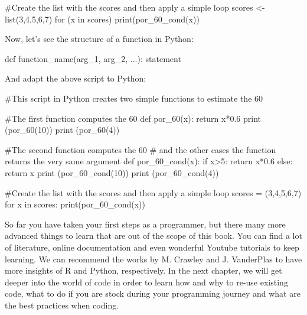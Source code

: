 \begin{exampler}
#Create the list with the scores and then apply a simple loop
scores <- list(3,4,5,6,7)
for (x in scores)
{
  print(por_60_cond(x))
}
\end{exampler}

Now, let’s see the structure of a function in Python:

\begin{examplepy}
def function_name(arg_1, arg_2, ...):
  statement
\end{examplepy}

And adapt the above script to Python:

\begin{examplepy}
#This script in Python creates two simple functions to estimate the 60%

#The first function computes the 60%
def por_60(x):
  return x*0.6
print (por_60(10))
print (por_60(4))

#The second function computes the 60%
# and the other cases the function returns the very same argument
def por_60_cond(x):
  if x>5:
    return x*0.6
  else:
    return x
print (por_60_cond(10))
print (por_60_cond(4))

#Create the list with the scores and then apply a simple loop
scores = (3,4,5,6,7)
for x in scores:
  print(por_60_cond(x))
\end{examplepy}

So far you have taken your first steps as a programmer, but there many more advanced things to learn that are out of the scope of this book. You can find a lot of literature, online documentation and even wonderful Youtube tutorials to keep learning. We can recommend the works by M. Crawley\cite{crawley2012r}  and J. VanderPlas\cite{vanderplas2016python}  to have more insights of R and Python, respectively. In the next chapter, we will get deeper into the world of code in order to learn how and why to re-use existing code, what to do if you are stock during your programming journey and what are the best practices when coding.
